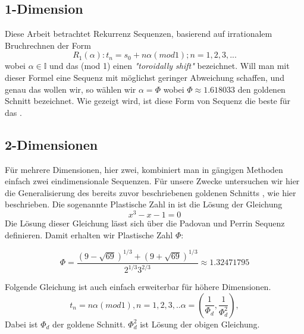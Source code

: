 \label{subsec:onedimensional}
\subsection{1-Dimension}
Diese Arbeit betrachtet Rekurrenz Sequenzen, basierend auf irrationalem 
Bruchrechnen der Form
\begin{equation}\label{eq:Rekurrenz Sequenz}
    R_{1}(\alpha) : t_n = s_0 + n\alpha(mod 1); n = 1,2,3,...
\end{equation}
wobei $\alpha \in \mathbb{I}$ und das (mod 1) einen \textit{"toroidally shift"}
bezeichnet. Will man mit dieser Formel eine Sequenz mit möglichst geringer
Abweichung schaffen, und genau das wollen wir, so wählen wir 
$\alpha = \Phi$ wobei $\Phi \approx 1.618033$ den goldenen Schnitt bezeichnet.
Wie \cite{quasirandomsequencesbyRoberts} gezeigt wird, ist diese Form von 
Sequenz die beste für das .  

\subsection{2-Dimensionen}

Für mehrere Dimensionen, hier zwei, kombiniert man in gängigen Methoden 
einfach zwei  eindimensionale Sequenzen.
Für unsere Zwecke untersuchen wir hier die Generalisierung des bereits 
zuvor beschriebenen goldenen Schnitts , wie
hier \cite{krcadinac2006new} beschrieben. 
Die sogenannte Plastische Zahl in ist die Lösung der
Gleichung 
\begin{equation}\label{eq:kubisch}
   x^{3} - x - 1 = 0
\end{equation}
Die Lösung dieser Gleichung lässt sich über die Padovan und Perrin Sequenz
definieren. Damit erhalten wir Plastische Zahl $\Phi$:

\begin{equation} \label{eq:plastische Nummer}
   \Phi = \frac{(9 - \sqrt{69})^{1/3} + (9 + \sqrt{69})^{1/3}}
               {2^{1/3}3^{2/3}} \approx 1.32471795
\end{equation}

\cite{vanderlaanplasticnumber}
\cite{wolframalphaPlastic}
Folgende Gleichung ist auch einfach erweiterbar für höhere Dimensionen.
\begin{equation}\label{eq:1 zu N - Dimensional}
    t_{n} = n\alpha(mod 1), n = 1,2,3,..
    \alpha = (\frac{1}{\Phi_{d}}, \frac{1}{\Phi_{d}^{2}}),
\end{equation}
Dabei ist $\Phi_{d}$ der goldene Schnitt. $\Phi_{d}^{2}$ ist Lösung der
 obigen Gleichung.


